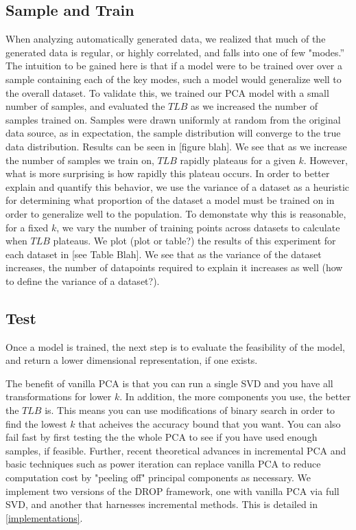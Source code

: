 \subsection{Sample and Train}
When analyzing automatically generated data, we realized that much of the generated data is regular, or highly correlated, and falls into one of few "modes.'' The intuition to be gained here is that if a model were to be trained over over a sample containing each of the key modes, such a model would generalize well to the overall dataset. To validate this, we trained our PCA model with a small number of samples, and evaluated the $TLB$ as we increased the number of samples trained on. Samples were drawn uniformly at random from the original data source, as in expectation, the sample distribution will converge to the true data distribution. Results can be seen in [figure blah]. We see that as we increase the number of samples we train on, $TLB$ rapidly plateaus for a given $k$. However, what is more surprising is how rapidly this plateau occurs. In order to better explain and quantify this behavior, we use the variance of a dataset as a heuristic for determining what proportion of the dataset a model must be trained on in order to generalize well to the population.  To demonstate why this is reasonable, for a fixed $k$, we vary the number of training points across datasets to calculate when $TLB$ plateaus. We plot (plot or table?) the results of this experiment for each dataset in [see Table Blah]. We see that as the variance of the dataset increases, the number of datapoints required to explain it increases as well (how to define the variance of a dataset?).

\subsection{Test}
Once a model is trained, the next step is to evaluate the feasibility of the model, and return a lower dimensional representation, if one exists. 


The benefit of vanilla PCA is that you can run a single SVD and you have all transformations for lower $k$. In addition, the more components you use, the better the $TLB$ is. This means you can use modifications of binary search in order to find the lowest $k$ that acheives the accuracy bound that you want. You can also fail fast by first testing the the whole PCA to see if you have used enough samples, if feasible. Further, recent theoretical advances in incremental PCA and basic techniques such as power iteration can replace vanilla PCA to reduce computation cost by "peeling off" principal components as necessary. We implement two versions of the DROP framework, one with vanilla PCA via full SVD, and another that harnesses incremental methods. This is detailed in \ref{implementations}.

